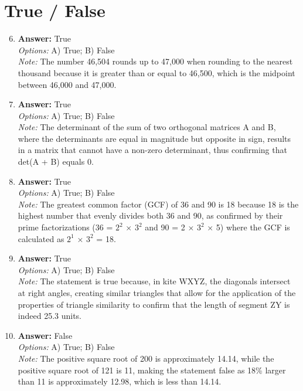 \documentclass[12pt]{article}
\begin{document}
\section*{True / False}
\begin{enumerate}[label=\arabic*.]
\setcounter{enumi}{5}
\item \textbf{Answer:} True
\\ \textit{Options:} A) True; B) False
\\ \textit{Note:} The number 46,504 rounds up to 47,000 when rounding to the nearest thousand because it is greater than or equal to 46,500, which is the midpoint between 46,000 and 47,000.
\item \textbf{Answer:} True
\\ \textit{Options:} A) True; B) False
\\ \textit{Note:} The determinant of the sum of two orthogonal matrices A and B, where the determinants are equal in magnitude but opposite in sign, results in a matrix that cannot have a non-zero determinant, thus confirming that det(A + B) equals 0.
\item \textbf{Answer:} True
\\ \textit{Options:} A) True; B) False
\\ \textit{Note:} The greatest common factor (GCF) of 36 and 90 is 18 because 18 is the highest number that evenly divides both 36 and 90, as confirmed by their prime factorizations (36 = $2^2$ × $3^2$ and 90 = 2 × $3^2$ × 5) where the GCF is calculated as $2^1$ × $3^2$ = 18.
\item \textbf{Answer:} True
\\ \textit{Options:} A) True; B) False
\\ \textit{Note:} The statement is true because, in kite WXYZ, the diagonals intersect at right angles, creating similar triangles that allow for the application of the properties of triangle similarity to confirm that the length of segment ZY is indeed 25.3 units.
\item \textbf{Answer:} False
\\ \textit{Options:} A) True; B) False
\\ \textit{Note:} The positive square root of 200 is approximately 14.14, while the positive square root of 121 is 11, making the statement false as 18\% larger than 11 is approximately 12.98, which is less than 14.14.
\end{enumerate}
\end{document}
